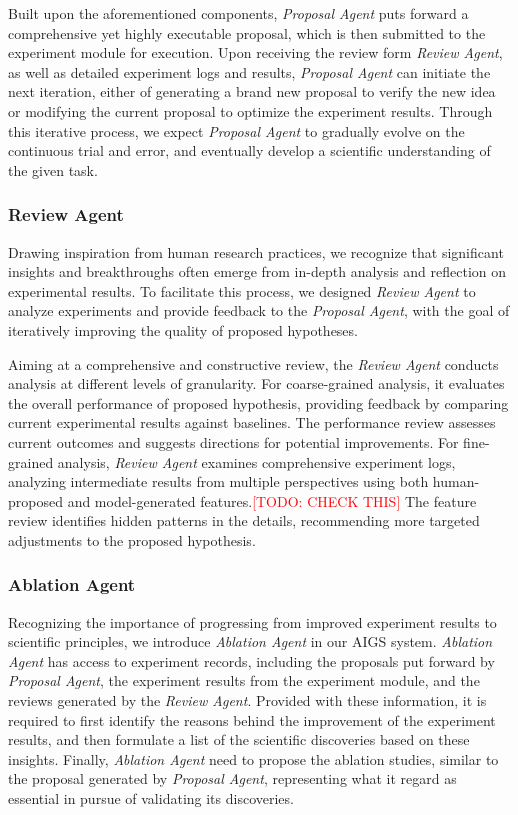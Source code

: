 \documentclass{article} %
\begin{document}
Built upon the aforementioned components, \textit{Proposal Agent} puts forward a comprehensive yet highly executable proposal, which is then submitted to the experiment module for execution. Upon receiving the review form \textit{Review Agent}, as well as detailed experiment logs and results, \textit{Proposal Agent} can initiate the next iteration, either of generating a brand new proposal to verify the new idea or modifying the current proposal to optimize the experiment results. Through this iterative process, we expect \textit{Proposal Agent} to gradually evolve on the continuous trial and error, and eventually develop a scientific understanding of the given task.

\subsubsection{Review Agent}
\label{sec:reviewagent}

Drawing inspiration from human research practices, we recognize that significant insights and breakthroughs often emerge from in-depth analysis and reflection on experimental results. To facilitate this process, we designed \textit{Review Agent} to analyze experiments and provide feedback to the \textit{Proposal Agent}, with the goal of iteratively improving the quality of proposed hypotheses.

Aiming at a comprehensive and constructive review, the \textit{Review Agent} conducts analysis at different levels of granularity. For coarse-grained analysis, it evaluates the overall performance of proposed hypothesis, providing feedback by comparing current experimental results against baselines. The performance review assesses current outcomes and suggests directions for potential improvements. For fine-grained analysis, \textit{Review Agent} examines comprehensive experiment logs, analyzing intermediate results from multiple perspectives using both human-proposed and model-generated features.\textcolor{red}{[TODO: CHECK THIS]} The feature review identifies hidden patterns in the details, recommending more targeted adjustments to the proposed hypothesis.

\subsubsection{Ablation Agent}

Recognizing the importance of progressing from improved experiment results to scientific principles, we introduce \textit{Ablation Agent} in our AIGS system. \textit{Ablation Agent} has access to experiment records, including the proposals put forward by \textit{Proposal Agent}, the experiment results from the experiment module, and the reviews generated by the \textit{Review Agent}. Provided with these information, it is required to first identify the reasons behind the improvement of the experiment results, and then formulate a list of the scientific discoveries based on these insights. Finally, \textit{Ablation Agent} need to propose the ablation studies, similar to the proposal generated by \textit{Proposal Agent}, representing what it regard as essential in pursue of validating its discoveries.
\end{document}
